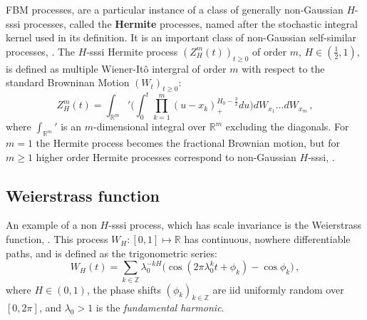 \documentclass[a4paper]{article}
\newcommand{\Real}{\mathbb{R}}
\begin{document}
FBM processes, are a particular instance of a class of generally non-Gaussian $H$-sssi
processes, called the \textbf{Hermite} processes, named after the stochastic integral
kernel used in its definition. It is an important class of non-Gaussian self-similar
processes, \cite{maejima2007}. The $H$-sssi Hermite process $(Z_H^m(t))_{t\geq 0}$
of order $m$, $H \in (\tfrac{1}{2}, 1)$, is defined as multiple Wiener-It\^o intergral
of order $m$ with respect to the standard Browninan Motion $(W_t)_{t\geq0}$:
\begin{equation}\label{eq:def_hermite}
    Z_H^m(t) = \int_{\Real^m}' \Biggl(
            \int_0^t \prod_{k=1}^m (u - x_k)_+^{H_0-\frac{3}{2}} du
        \Biggr) dW_{x_1} \ldots dW_{x_m}\,,
\end{equation}
where $\int_{\Real^m}'$ is an $m$-dimensional integral over $\Real^m$ excluding the
diagonals. For $m=1$ the Hermite process becomes the fractional Brownian motion,
but for $m\geq 1$ higher order Hermite processes correspond to non-Gaussian $H$-sssi,
\cite{Bai20141710,Chronopoulou:1114288,embrechts2000introduction}.


\subsection{Weierstrass function} %
\label{sub:weierstrass_function}

An example of a non $H$-sssi process, which has scale invariance is the Weierstrass
function, \cite{decrouez2013}. This process $W_H:[0,1] \mapsto \Real$ has continuous,
nowhere differentiable paths, and is defined as the trigonometric series:
\begin{equation} \label{eq:def_weir}
    W_H(t) = \sum_{k\in \mathbb{Z}} \lambda_0^{-k H} \bigl(
            \cos(2\pi \lambda_0^k t + \phi_k) - \cos \phi_k
        \bigr) \,,
\end{equation}
where $H\in(0, 1)$, the phase shifts $(\phi_k)_{k\in\mathbb{Z}}$ are iid uniformly
random over $[0, 2\pi]$, and $\lambda_0 > 1$ is the \emph{fundamental harmonic}.
\end{document}
